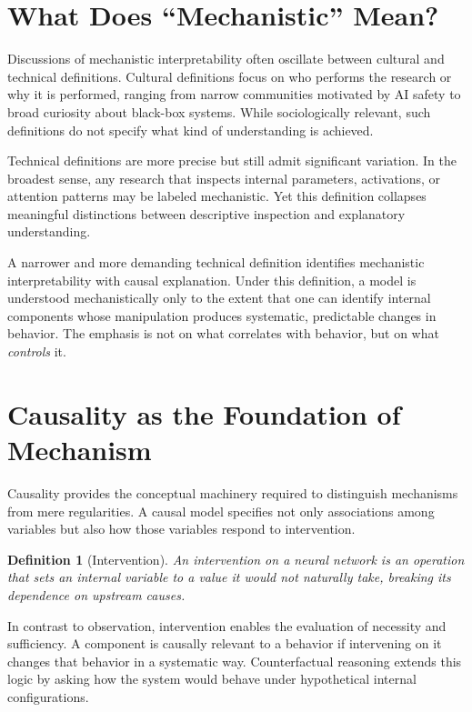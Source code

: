 \documentclass[11pt]{article}
\newtheorem{definition}{Definition}
\begin{document}
\section{What Does ``Mechanistic'' Mean?}

Discussions of mechanistic interpretability often oscillate between cultural and
technical definitions. Cultural definitions focus on who performs the research
or why it is performed, ranging from narrow communities motivated by AI safety
to broad curiosity about black-box systems. While sociologically relevant, such
definitions do not specify what kind of understanding is achieved.

Technical definitions are more precise but still admit significant variation.
In the broadest sense, any research that inspects internal parameters,
activations, or attention patterns may be labeled mechanistic. Yet this
definition collapses meaningful distinctions between descriptive inspection and
explanatory understanding.

A narrower and more demanding technical definition identifies mechanistic
interpretability with causal explanation. Under this definition, a model is
understood mechanistically only to the extent that one can identify internal
components whose manipulation produces systematic, predictable changes in
behavior. The emphasis is not on what correlates with behavior, but on what
\emph{controls} it.

\section{Causality as the Foundation of Mechanism}

Causality provides the conceptual machinery required to distinguish mechanisms
from mere regularities. A causal model specifies not only associations among
variables but also how those variables respond to intervention.

\begin{definition}[Intervention]
An intervention on a neural network is an operation that sets an internal
variable to a value it would not naturally take, breaking its dependence on
upstream causes.
\end{definition}

In contrast to observation, intervention enables the evaluation of necessity
and sufficiency. A component is causally relevant to a behavior if intervening
on it changes that behavior in a systematic way. Counterfactual reasoning
extends this logic by asking how the system would behave under hypothetical
internal configurations.
\end{document}
